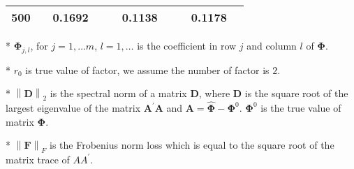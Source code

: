 \documentclass[12pt,a4paper,hyperref]{article}
\begin{document}
\begin{table}[H]
\begin{threeparttable}
\begin{tabular} {*{10}{c}}
500& & 0.1692& &  & 0.1138& & & 0.1178& \\
\bottomrule
\end{tabular}
\begin{tablenotes}
\footnotesize
  \item[*] $\boldsymbol{\Phi}_{j,l}$, for $j=1,\ldots m$, $l=1,\ldots$ is the coefficient in row $j$ and column $l$ of $\boldsymbol{\Phi}$.
\item[*] $r_{0}$ is true value of factor, we assume the number of factor is $2$.
 \item[*] $\left\| \boldsymbol{D} \right\|_{2}$ is the spectral norm of a matrix $\boldsymbol{D}$, where $\boldsymbol{D}$ is the square root of the largest eigenvalue of the matrix $\boldsymbol{A}^{'}\boldsymbol{A}$ and $\boldsymbol{A}=\hat{\boldsymbol{\Phi}}- \boldsymbol{\Phi}^{0}$. $\boldsymbol{\Phi}^{0}$ is the true value of matrix $\boldsymbol{\Phi}$.
 \item[*] $\left\| \boldsymbol{F} \right\|_{F} $ is the Frobenius norm loss which is equal to the square root of the matrix trace of $AA^{'}$.
    \end{tablenotes}
\end{threeparttable}
\end{table}
\end{document}
